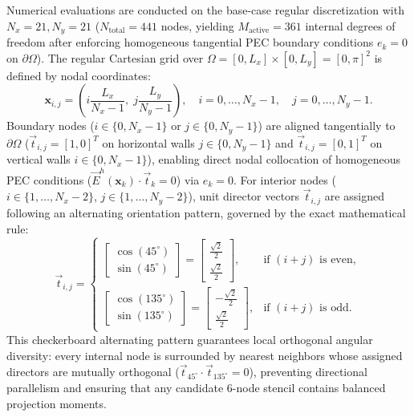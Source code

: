 \documentclass[preprint,12pt]{elsarticle}
\begin{document}
Numerical evaluations are conducted on the base-case regular discretization with $N_x = 21, N_y = 21$ ($N_{\mathrm{total}} = 441$ nodes, yielding $M_{\mathrm{active}} = 361$ internal degrees of freedom after enforcing homogeneous tangential PEC boundary conditions $e_k = 0$ on $\partial\Omega$). The regular Cartesian grid over $\Omega = [0, L_x] \times [0, L_y] = [0, \pi]^2$ is defined by nodal coordinates:
\begin{equation}
\mathbf{x}_{i,j} = \left(i \frac{L_x}{N_x - 1}, \; j \frac{L_y}{N_y - 1}\right), \quad i = 0, \dots, N_x - 1, \quad j = 0, \dots, N_y - 1.
\label{eq:regular_grid_coords}
\end{equation}
Boundary nodes ($i \in \{0, N_x-1\}$ or $j \in \{0, N_y-1\}$) are aligned tangentially to $\partial\Omega$ ($\vec{t}_{i,j} = [1, 0]^T$ on horizontal walls $j \in \{0, N_y-1\}$ and $\vec{t}_{i,j} = [0, 1]^T$ on vertical walls $i \in \{0, N_x-1\}$), enabling direct nodal collocation of homogeneous PEC conditions ($\vec{E}^h(\mathbf{x}_k) \cdot \vec{t}_k = 0$) via $e_k = 0$. For interior nodes ($i \in \{1, \dots, N_x-2\}$, $j \in \{1, \dots, N_y-2\}$), unit director vectors $\vec{t}_{i,j}$ are assigned following an alternating orientation pattern, governed by the exact mathematical rule:
\begin{equation}
\vec{t}_{i,j} = \begin{cases} 
\begin{bmatrix} \cos(45^\circ) \\ \sin(45^\circ) \end{bmatrix} = \begin{bmatrix} \frac{\sqrt{2}}{2} \\ \frac{\sqrt{2}}{2} \end{bmatrix}, & \text{if } (i + j) \text{ is even}, \\[10pt]
\begin{bmatrix} \cos(135^\circ) \\ \sin(135^\circ) \end{bmatrix} = \begin{bmatrix} -\frac{\sqrt{2}}{2} \\ \frac{\sqrt{2}}{2} \end{bmatrix}, & \text{if } (i + j) \text{ is odd}.
\end{cases}
\label{eq:alternating_directors_def}
\end{equation}
This checkerboard alternating pattern guarantees local orthogonal angular diversity: every internal node is surrounded by nearest neighbors whose assigned directors are mutually orthogonal ($\vec{t}_{45^\circ} \cdot \vec{t}_{135^\circ} = 0$), preventing directional parallelism and ensuring that any candidate 6-node stencil contains balanced projection moments.
\end{document}
